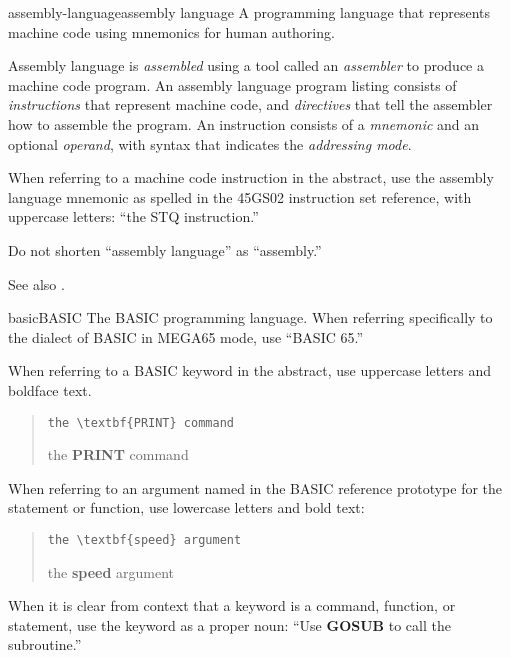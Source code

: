 \begin{sgentry}{assembly-language}{assembly language}
    A programming language that represents machine code using mnemonics for human authoring.

    Assembly language is \emph{assembled} using a tool called an \emph{assembler} to produce a machine code program. An assembly language program listing consists of \emph{instructions} that represent machine code, and \emph{directives} that tell the assembler how to assemble the program. An instruction consists of a \emph{mnemonic} and an optional \emph{operand}, with syntax that indicates the \emph{addressing mode}.

    When referring to a machine code instruction in the abstract, use the assembly language mnemonic as spelled in the 45GS02 instruction set reference, with uppercase letters: ``the STQ instruction.''

    Do not shorten ``assembly language'' as ``assembly.''

    See also .
\end{sgentry}

\begin{sgentry}{basic}{BASIC}
    The BASIC programming language. When referring specifically to the dialect of BASIC in MEGA65 mode, use ``BASIC 65.''

    When referring to a BASIC keyword in the abstract, use uppercase letters and boldface text.

    \begin{quote}
        \texttt{the {\textbackslash}textbf\{PRINT\} command}

        \hrulefill

        the \textbf{PRINT} command
    \end{quote}

    When referring to an argument named in the BASIC reference prototype for the statement or function, use lowercase letters and bold text:

    \begin{quote}
        \texttt{the {\textbackslash}textbf\{speed\} argument}

        \hrulefill

        the \textbf{speed} argument
    \end{quote}

    When it is clear from context that a keyword is a command, function, or statement, use the keyword as a proper noun: ``Use \textbf{GOSUB} to call the subroutine.''
\end{sgentry}

